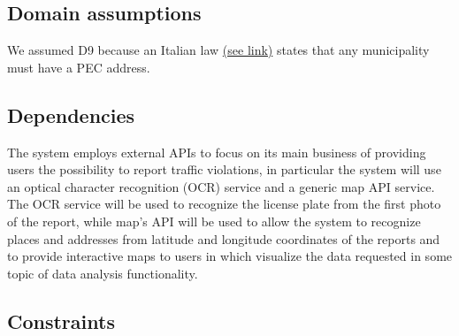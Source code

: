 \subsection{Domain assumptions}

\begin{enumerate}[label={D\arabic*.}]
	 \label{D_email}
     \label{D_reports}
     \label{D_mun_availability}
   	 \label{D_mun_accuracy}
     \label{D_auth_validation}
     \label{D_gps}
     \label{D_internet}
     \label{D_city_auth}
     \label{D_pce}
     \label{D_unique_license_plate}
   	 \label{D_photo}
   	 \label{D_OCR}
   	 \label{D_maps}
\end{enumerate}
We assumed D9 because an Italian law \hyperlink{CircolarePEC}{(see link)} states that any municipality must have a PEC address.

\subsection{Dependencies}

The system employs external APIs to focus on its main business of providing users the possibility to report traffic violations, in particular the system will use an optical character recognition (OCR) service and a generic map API service. The OCR service will be used to recognize the license plate from the first photo of the report, while map's API will be used to allow the system to recognize places and addresses from latitude and longitude coordinates of the reports and to provide interactive maps to users in which visualize the data requested in some topic of data analysis functionality.
\subsection{Constraints}

